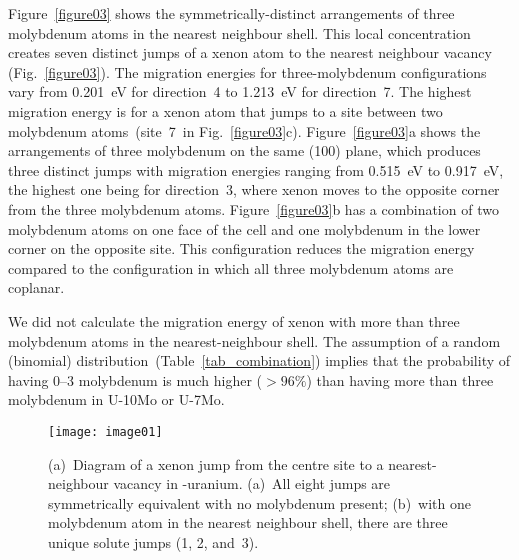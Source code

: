 Figure~\ref{figure03} shows the symmetrically-distinct arrangements of three
molybdenum atoms in the nearest neighbour shell.
This local concentration creates seven distinct jumps of a xenon atom to the
nearest neighbour vacancy (Fig.~\ref{figure03}).
The migration energies for three-molybdenum configurations vary from 0.201~eV
for direction~4 to 1.213~eV for direction~7.
The highest migration energy is for a xenon atom that jumps to a site between
two molybdenum atoms~(site~7\ in Fig.~\ref{figure03}c).
Figure~\ref{figure03}a shows the arrangements of three molybdenum on the same
\hkl(100) plane, which produces three distinct jumps with migration energies
ranging from 0.515~eV to 0.917~eV, the highest one being for direction~3,
where xenon moves to the opposite corner from the three molybdenum atoms.
Figure~\ref{figure03}b has a combination of two molybdenum atoms on one face of
the cell and one molybdenum in the lower corner on the opposite site. 
This configuration reduces the migration energy compared to the configuration
in which all three molybdenum atoms are coplanar. 

We did not calculate the migration energy of xenon with more than three
molybdenum atoms in the nearest-neighbour shell.
The assumption of a random (binomial)
distribution~(Table~\ref{tab_combination}) implies that the
probability of having 0--3 molybdenum is much higher ($> 96\%$) than having
more than three molybdenum in U-10Mo or U-7Mo.


\begin{figure}
  \centering
  \texttt{[image: image01]}
  \caption{(a)~Diagram of a xenon jump from the centre site to a
    nearest-neighbour vacancy in \textgamma-uranium.
    (a)~All eight jumps are symmetrically equivalent with no molybdenum
    present;
    (b)~with one molybdenum atom in the nearest neighbour shell, there are
        three unique solute jumps (1, 2, and~3).}
    \label{figure01}
\end{figure}

